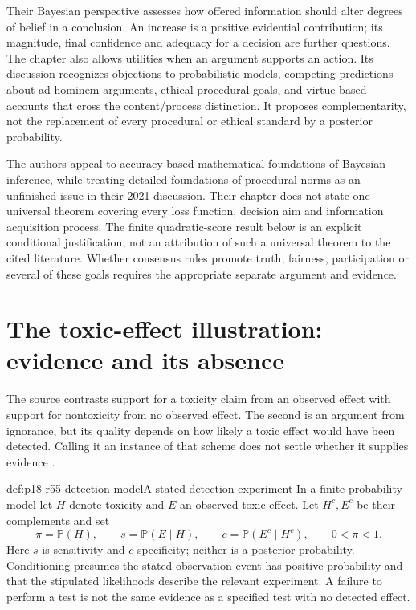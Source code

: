 Their Bayesian perspective assesses how offered information should alter
degrees of belief in a conclusion. An increase is a positive evidential
contribution; its magnitude, final confidence and adequacy for a decision
are further questions. The chapter also allows utilities when an argument
supports an action. Its discussion recognizes objections to probabilistic
models, competing predictions about ad hominem arguments, ethical
procedural goals, and virtue-based accounts that cross the content/process
distinction. It proposes complementarity, not the replacement of every
procedural or ethical standard by a posterior probability.

The authors appeal to accuracy-based mathematical foundations of Bayesian
inference, while treating detailed foundations of procedural norms as an
unfinished issue in their 2021 discussion. Their chapter does not state
one universal theorem covering every loss function, decision aim and
information acquisition process. The finite quadratic-score result below
is an explicit conditional justification, not an attribution of such a
universal theorem to the cited literature. Whether consensus rules promote
truth, fairness, participation or several of these goals requires the
appropriate separate argument and evidence.

\section{The toxic-effect illustration: evidence and its absence}

The source contrasts support for a toxicity claim from an observed effect
with support for nontoxicity from no observed effect. The second is an
argument from ignorance, but its quality depends on how likely a toxic
effect would have been detected. Calling it an instance of that scheme
does not settle whether it supplies evidence
\cite[p.~363]{HahnCollins2021ArgumentationTheory}.

\begin{hbdefinition}{def:p18-r55-detection-model}{A stated detection experiment}
In a finite probability model let \(H\) denote toxicity and \(E\)
an observed toxic effect. Let \(H^c,E^c\) be their complements and set
\[
 \pi=\mathbb P(H),\qquad
 s=\mathbb P(E\mid H),\qquad
 c=\mathbb P(E^c\mid H^c),\qquad 0<\pi<1.
\]
Here \(s\) is sensitivity and \(c\) specificity; neither is a
posterior probability. Conditioning presumes the stated observation
event has positive probability and that the stipulated likelihoods
describe the relevant experiment. A failure to perform a test is not
the same evidence as a specified test with no detected effect.
\end{hbdefinition}

